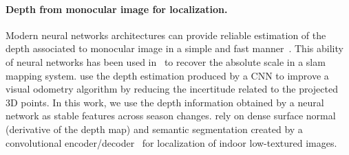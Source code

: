 \paragraph{Depth from monocular image for localization.} Modern neural networks architectures can provide reliable estimation of the depth associated to monocular image in a simple and fast manner~\citep{Eigen2014, Godard2017, Mahjourian2018}. This ability of neural networks has been used in~\citep{Tateno2017} to recover the absolute scale in a \ac{slam} mapping system. \citet{Loo2019} use the depth estimation produced by a CNN to improve a visual odometry algorithm by reducing the incertitude related to the projected 3D points. In this work, we use the depth information obtained by a neural network as stable features across season changes. \citet{Taira2019} rely on dense surface normal (derivative of the depth map) and semantic segmentation created by a convolutional encoder/decoder~\citep{Zamir2018} for localization of indoor low-textured images.